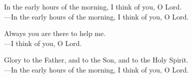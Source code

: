 \responsory

\noindent In the early hours of the morning, I think of you, O Lord.\\
{\color{red}---\thinspace}In the early hours of the morning, I think of you, O Lord.

\medskip\noindent Always you are there to help me.\\
{\color{red}---\thinspace}I think of you, O Lord.

\medskip\noindent Glory to the Father, and to the Son, and to the Holy Spirit.\\
{\color{red}---\thinspace}In the early hours of the morning, I think of you, O Lord.